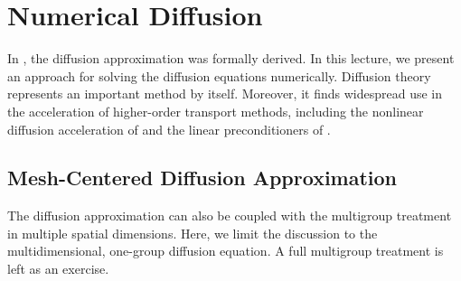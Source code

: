 \chapter{Numerical Diffusion}
\label{lec:numerical_diffusion}

In , the diffusion approximation 
was formally derived.  In this lecture,  we present an approach 
for solving the diffusion equations numerically.  Diffusion theory 
represents an important method by itself.  Moreover, it finds widespread
use in the acceleration of higher-order transport methods, including 
the nonlinear diffusion acceleration of  and
the linear preconditioners of .

\section*{Mesh-Centered Diffusion Approximation}

The diffusion approximation can also be coupled with the 
multigroup treatment in multiple spatial dimensions.  Here,
we limit the discussion to the multidimensional, one-group
diffusion equation.  A full multigroup treatment is left as 
an exercise.

